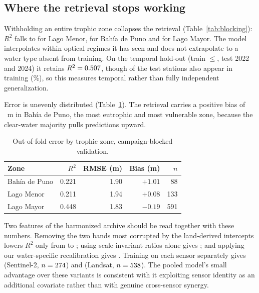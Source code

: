\documentclass[final,5p,times,twocolumn,authoryear]{elsarticle}
\newcommand{\tabfit}{\small\setlength{\tabcolsep}{4pt}\renewcommand{\arraystretch}{1.08}}
\begin{document}
\subsection{Where the retrieval stops working}

Withholding an entire trophic zone collapses the retrieval
(Table~\ref{tab:blocking}): $R^2$ falls to \numZoneoutMenorRTwo{} for Lago
Menor, \numZoneoutPunoRTwo{} for Bah\'ia de Puno and \numZoneoutMayorRTwo{}
for Lago Mayor. The model interpolates within optical regimes it has seen and
does not extrapolate to a water type absent from training. On the temporal
hold-out (train $\le$\numTemporalCut, test 2022 and 2024) it retains
$R^2=0.507$, though \numTemporalShared{} of the
\numTemporalTestStations{} test stations also appear in training
(\numTemporalOverlapPct\%), so this measures temporal rather than fully
independent generalization.

Error is unevenly distributed (Table~\ref{tab:zone}). The retrieval carries a
positive bias of \numZoneBahiaDePunoBias~m in Bah\'ia de Puno, the most
eutrophic and most vulnerable zone, because the clear-water majority pulls
predictions upward.

\begin{table}[htbp]
\caption{Out-of-fold error by trophic zone, campaign-blocked validation.}
\label{tab:zone}
\tabfit
\centering
\begin{tabular}{@{}lrrrr@{}}
\toprule
Zone & $R^2$ & RMSE (m) & Bias (m) & $n$ \\
\midrule
Bah\'ia de Puno & 0.221 & 1.90 & $+1.01$ & 88  \\
Lago Menor      & 0.211 & 1.94 & $+0.08$ & 133 \\
Lago Mayor      & 0.448 & 1.83 & $-0.19$ & 591 \\
\bottomrule
\end{tabular}
\end{table}

Two features of the harmonized archive should be read together with these
numbers. Removing the two bands most corrupted by the land-derived intercepts
lowers $R^2$ only from \numHeadlineRTwo{} to \numVisibleRTwo; using
scale-invariant ratios alone gives \numRatiosRTwo; and applying our
water-specific recalibration gives \numLocalReharmRTwo. Training on each
sensor separately gives \numSTwoOnlyRTwo{} (Sentinel-2, $n=274$)
and \numLsOnlyRTwo{} (Landsat, $n=538$). The pooled model's small
advantage over these variants is consistent with it exploiting sensor
identity as an additional covariate rather than with genuine cross-sensor
synergy.
\end{document}
